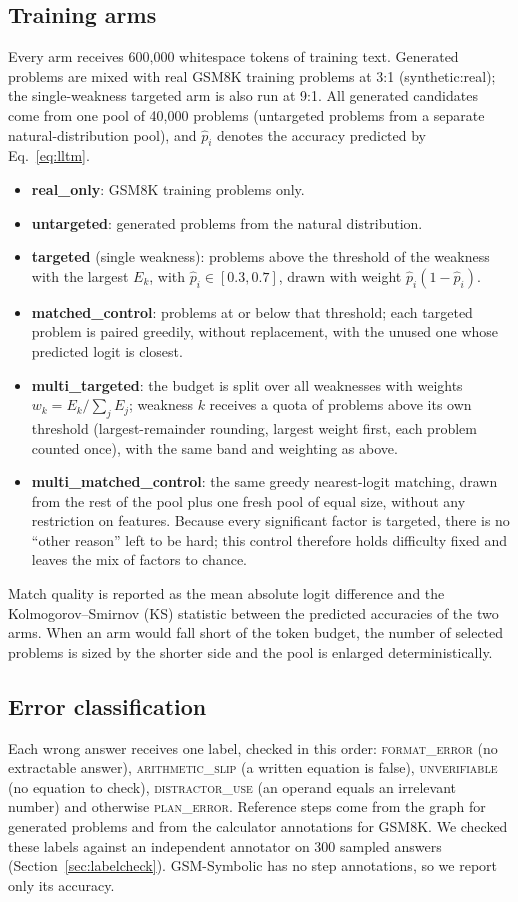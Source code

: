 \documentclass[11pt]{article}
\begin{document}
\subsection{Training arms}
Every arm receives 600{,}000 whitespace tokens of training text. Generated problems are mixed with real GSM8K training
problems at 3:1 (synthetic:real); the single-weakness targeted arm is also run at 9:1. All generated candidates come from
one pool of 40{,}000 problems (untargeted problems from a separate natural-distribution pool), and $\hat p_i$ denotes the accuracy predicted by Eq.~\eqref{eq:lltm}.
\begin{itemize}
  \item \textbf{real\_only}: GSM8K training problems only.
  \item \textbf{untargeted}: generated problems from the natural distribution.
  \item \textbf{targeted} (single weakness): problems above the threshold of the weakness with the largest $E_k$, with
  $\hat p_i\in[0.3,0.7]$, drawn with weight $\hat p_i(1-\hat p_i)$.
  \item \textbf{matched\_control}: problems at or below that threshold; each targeted problem is paired greedily,
  without replacement, with the unused one whose predicted logit is closest.
  \item \textbf{multi\_targeted}: the budget is split over all weaknesses with weights $w_k = E_k / \sum_j E_j$; weakness
  $k$ receives a quota of problems above its own threshold (largest-remainder rounding, largest weight first, each
  problem counted once), with the same band and weighting as above.
  \item \textbf{multi\_matched\_control}: the same greedy nearest-logit matching, drawn from the rest of the pool plus
  one fresh pool of equal size, without any restriction on features. Because every significant factor is targeted,
  there is no ``other reason'' left to be hard; this control therefore holds difficulty fixed and leaves the mix of
  factors to chance.
\end{itemize}
Match quality is reported as the mean absolute logit difference and the Kolmogorov--Smirnov (KS) statistic between the
predicted accuracies of the two arms. When an arm would fall short of the token budget, the number of selected problems
is sized by the shorter side and the pool is enlarged deterministically.

\subsection{Error classification}
Each wrong answer receives one label, checked in this order: \textsc{format\_error} (no extractable answer),
\textsc{arithmetic\_slip} (a written equation is false), \textsc{unverifiable} (no equation to check),
\textsc{distractor\_use} (an operand equals an irrelevant number) and otherwise \textsc{plan\_error}. Reference steps
come from the graph for generated problems and from the calculator annotations for GSM8K. We checked these labels
against an independent annotator on 300 sampled answers (Section~\ref{sec:labelcheck}). GSM-Symbolic has no step
annotations, so we report only its accuracy.
\end{document}

